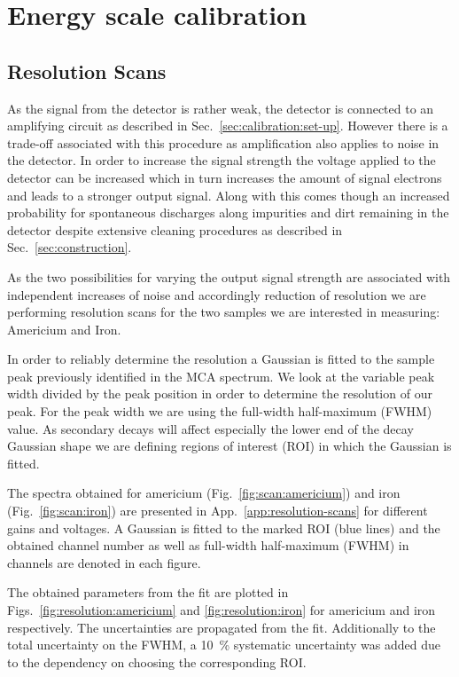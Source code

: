 \section{Energy scale calibration}
\label{sec:energy_scan}

\subsection{Resolution Scans}
\label{sec:resolution_scans}
As the signal from the detector is rather weak, the detector is connected to an
amplifying circuit as described in Sec.~\ref{sec:calibration:set-up}. However
there is a trade-off associated with this procedure as amplification also
applies to noise in the detector. In order to increase the signal strength the
voltage applied to the detector can be increased which in turn increases the
amount of signal electrons and leads to a stronger output signal. Along with
this comes though an increased probability for spontaneous discharges along
impurities and dirt remaining in the detector despite extensive cleaning
procedures as described in Sec.~\ref{sec:construction}.

As the two possibilities for varying the output signal strength are associated
with independent increases of noise and accordingly reduction of resolution we
are performing resolution scans for the two samples we are interested in
measuring: Americium and Iron.

In order to reliably determine the resolution a Gaussian is fitted to the sample
peak previously identified in the MCA spectrum. We look
at the variable peak width divided by the peak position in order to determine
the resolution of our peak. For the peak width we are using the full-width
half-maximum (FWHM) value. As secondary decays will affect especially the lower
end of the decay Gaussian  shape we are defining regions of interest (ROI) in which the Gaussian
is fitted.

The spectra obtained for americium (Fig.~\ref{fig:scan:americium}) and iron
(Fig.~\ref{fig:scan:iron}) are presented in App.~\ref{app:resolution-scans} for different gains and voltages.
A Gaussian is fitted to the marked ROI (blue lines) and the obtained channel number as well as
full-width half-maximum (FWHM) in channels are denoted in each figure.

The obtained parameters from the fit are plotted in Figs.~\ref{fig:resolution:americium} and \ref{fig:resolution:iron} for americium and
iron respectively. The uncertainties are propagated from the fit. Additionally to the
total uncertainty on the FWHM, a \SI{10}{\percent} systematic
uncertainty was added due to the dependency on choosing the corresponding ROI.

